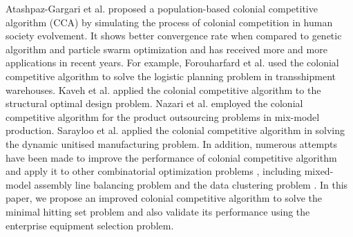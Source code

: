 Atashpaz-Gargari et al. \citep{c11} proposed a population-based colonial competitive algorithm (CCA) by simulating the process of colonial competition in human society evolvement.
It shows better convergence rate when compared to genetic algorithm and particle swarm optimization and has received more and more applications in recent years.
For example, Forouharfard et al. \citep{c12} used the colonial competitive algorithm to solve the logistic planning problem in transshipment warehouses.
Kaveh et al. \citep{c13} applied the colonial competitive algorithm to the structural optimal design problem.
Nazari et al. \citep{c14} employed the colonial competitive algorithm for the product outsourcing problems in mix-model production.
Sarayloo et al. \citep{c15} applied the colonial competitive algorithm in solving the dynamic unitised manufacturing problem. 
In addition, numerous attempts have been made to improve the performance of colonial competitive algorithm and apply it to other combinatorial optimization problems \citep{c16}, including mixed-model assembly line balancing problem \citep{c17} and the data clustering problem \citep{c18}.
In this paper, we propose an improved colonial competitive algorithm to solve the minimal hitting set problem and also validate its performance using the enterprise equipment selection problem.